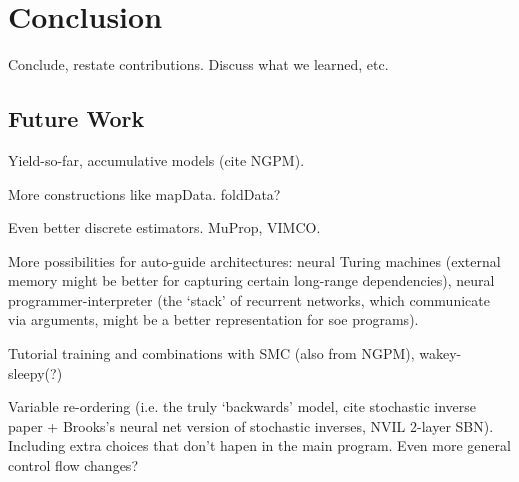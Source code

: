 \section{Conclusion}
\label{sec:conclusion}

Conclude, restate contributions. Discuss what we learned, etc.

\subsection{Future Work}
\label{sec:conclusion_futureWork}

Yield-so-far, accumulative models (cite NGPM).

More constructions like mapData. foldData?

Even better discrete estimators. MuProp, VIMCO.

More possibilities for auto-guide architectures: neural Turing machines (external memory might be better for capturing certain long-range dependencies), neural programmer-interpreter (the `stack' of recurrent networks, which communicate via arguments, might be a better representation for soe programs).

Tutorial training and combinations with SMC (also from NGPM), wakey-sleepy(?)

Variable re-ordering (i.e. the truly `backwards' model, cite stochastic inverse paper + Brooks's neural net version of stochastic inverses, NVIL 2-layer SBN). Including extra choices that don't hapen in the main program. Even more general control flow changes?

